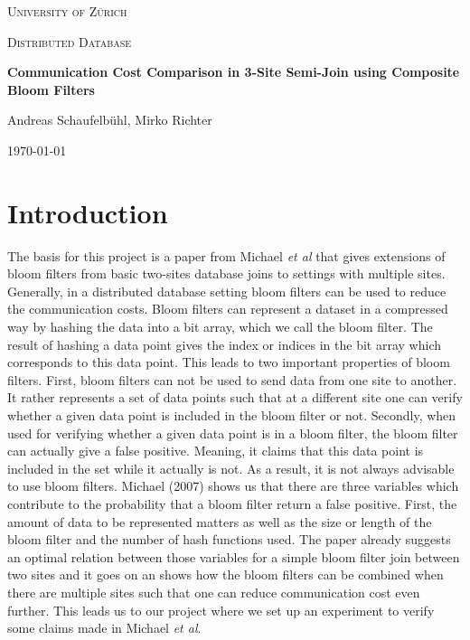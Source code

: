 \documentclass[12]{scrartcl}
\begin{document}
\begin{titlepage}
	\centering
	{\scshape\LARGE University of Zürich\par}
	\vspace{1cm}
	{\scshape\Large Distributed Database\par}
	\vspace{1.5cm}
	{\huge\bfseries Communication Cost Comparison in 3-Site Semi-Join using Composite Bloom Filters\par}
	\vspace{2cm}
	{\Large Andreas Schaufelbühl, Mirko Richter\par}
	\vfill
	
	{\large \today\par}
\end{titlepage}

\tableofcontents
\listoffigures
\listoftables
	
\section{Introduction}
The basis for this project is a paper from Michael {\em et al}\cite{michael} that gives extensions of bloom filters from basic two-sites database joins to settings with multiple sites. Generally, in a distributed database setting bloom filters can be used to reduce the communication costs. Bloom filters can represent a dataset in a compressed way by hashing the data into a bit array, which we call the bloom filter. The result of hashing a data point gives the index or indices in the bit array which corresponds to this data point. This leads to two important properties of bloom filters. First, bloom filters can not be used to send data from one site to another. It rather represents a set of data points such that at a different site one can verify whether a given data point is included in the bloom filter or not. Secondly, when used for verifying whether a given data point is in a bloom filter, the bloom filter can actually give a false positive. Meaning, it claims that this data point is included in the set while it actually is not. As a result, it is not always advisable to use bloom filters. Michael (2007) shows us that there are three variables which contribute to the probability that a bloom filter return a false positive. First, the amount of data to be represented matters as well as the size or length of the bloom filter and the number of hash functions used. The paper already suggests an optimal relation between those variables for a simple bloom filter join between two sites and it goes on an shows how the bloom filters can be combined when there are multiple sites such that one can reduce communication cost even further. This leads us to our project where we set up an experiment to verify some claims made in Michael {\em et al}\cite{michael}.
\end{document}
